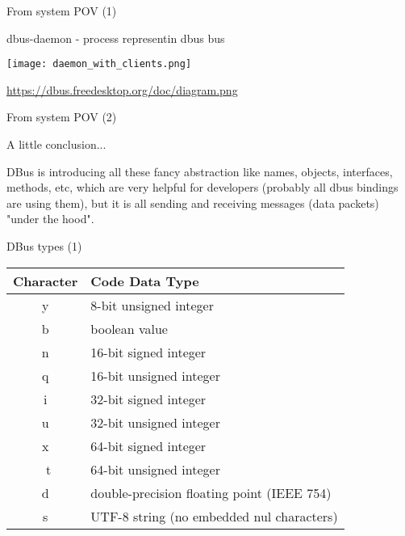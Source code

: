 \documentclass{beamer}
\begin{document}
\begin{frame}{From system POV (1)}
  \begin{block}{}
    dbus-daemon - process representin dbus bus
  \end{block}
  \begin{center}
    \texttt{[image: daemon\_with\_clients.png]}
  \end{center}
  \url{https://dbus.freedesktop.org/doc/diagram.png}
\end{frame}

\begin{frame}{From system POV (2)}
  \begin{block}{A little conclusion...}
    \begin{large}
      DBus is introducing all these fancy abstraction like names, objects, interfaces, methods, etc, which are very helpful for developers (probably all dbus bindings are using them), but it is all sending and receiving messages (data packets) "under the hood".
    \end{large}
  \end{block}
\end{frame}

\begin{frame}{DBus types (1)}
  \begin{center}
    \begin{normalsize}
      \begin{tabulary}{1.0\textwidth}{|C|L|}
\hline
Character & Code Data Type\\
\hline
\hline
y & 8-bit unsigned integer\\
\hline
b & boolean value\\
\hline
n & 16-bit signed integer\\
\hline
q & 16-bit unsigned integer\\
\hline
i & 32-bit signed integer\\
\hline
u & 32-bit unsigned integer\\
\hline
x & 64-bit signed integer\\
\hline\
t & 64-bit unsigned integer\\
\hline
d & double-precision floating point (IEEE 754)\\
\hline
s & UTF-8 string (no embedded nul characters)\\
\hline
      \end{tabulary}
    \end{normalsize}
  \end{center}
\end{frame}
\end{document}
